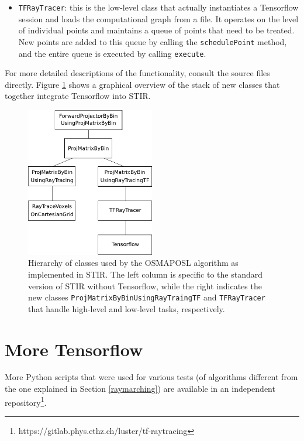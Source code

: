 \documentclass[a4paper, 11pt]{article}
\begin{document}
\begin{itemize}
    \item \texttt{TFRayTracer}: this is the low-level class that actually instantiates a Tensorflow session and loads the computational graph from a file. It operates on the level of individual points and maintains a queue of points that need to be treated. New points are added to this queue by calling the \texttt{schedulePoint} method, and the entire queue is executed by calling \texttt{execute}.
  \end{itemize}

  For more detailed descriptions of the functionality, consult the source files directly. Figure \ref{stir-class-structure} shows a graphical overview of the stack of new classes that together integrate Tensorflow into STIR.

  \begin{figure}
    \centering
    \includegraphics[width = 0.5\textwidth]{../ClassStructureSTIR.pdf}
    \caption{Hierarchy of classes used by the OSMAPOSL algorithm as implemented in STIR. The left column is specific to the standard version of STIR without Tensorflow, while the right indicates the new classes \texttt{ProjMatrixByBinUsingRayTraingTF} and \texttt{TFRayTracer} that handle high-level and low-level tasks, respectively.}
    \label{stir-class-structure}
  \end{figure}

  \section{More Tensorflow}
  \label{more_tf}
  More Python scripts that were used for various tests (of algorithms different from the one explained in Section \ref{raymarching}) are available in an independent repository\footnote{https://gitlab.phys.ethz.ch/luster/tf-raytracing}.
\end{document}
